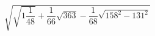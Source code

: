 \begin{ex}[type=calculate]
	\begin{condition}
		\( \sqrt{\sqrt{1\dfrac{1}{48}}+\dfrac{1}{66}\sqrt{363}-\dfrac{1}{68}\sqrt{158^2-131^2}} \)
	\end{condition}
\end{ex}
